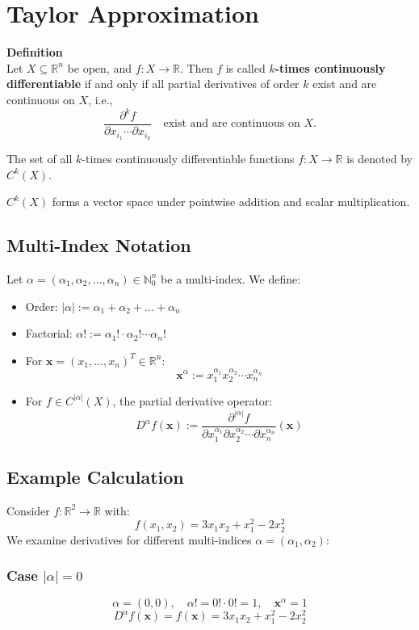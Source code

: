\documentclass{article}
\begin{document}
\section{Taylor Approximation}
\textbf{Definition} \\
Let \( X \subseteq \mathbb{R}^n \) be open, and \( f: X \to \mathbb{R} \). Then \( f \) is called 
\textbf{$k$-times continuously differentiable} if and only if all partial derivatives of order \( k \) exist and are continuous on \( X \), i.e.,
\[
\frac{\partial^k f}{\partial x_{i_1} \cdots \partial x_{i_k}} \quad \text{exist and are continuous on } X.
\]

The set of all $k$-times continuously differentiable functions \( f: X \to \mathbb{R} \) is denoted by \( C^k(X) \).

\( C^k(X) \) forms a vector space under pointwise addition and scalar multiplication.

\subsection*{Multi-Index Notation}
Let \( \alpha = (\alpha_1, \alpha_2, \dots, \alpha_n) \in \mathbb{N}_0^n \) be a multi-index. We define:
\begin{itemize}
    \item Order: \( |\alpha| := \alpha_1 + \alpha_2 + \dots + \alpha_n \)
    \item Factorial: \( \alpha! := \alpha_1! \cdot \alpha_2! \cdots \alpha_n! \)
    \item For \( \bm{x} = (x_1, \dots, x_n)^T \in \mathbb{R}^n \):
    \[
    \bm{x}^\alpha := x_1^{\alpha_1} x_2^{\alpha_2} \cdots x_n^{\alpha_n}
    \]
    \item For \( f \in C^{|\alpha|}(X) \), the partial derivative operator:
    \[
    D^\alpha f(\bm{x}) := \frac{\partial^{|\alpha|} f}{\partial x_1^{\alpha_1} \partial x_2^{\alpha_2} \cdots \partial x_n^{\alpha_n}} (\bm{x})
    \]
\end{itemize}
\newpage
\subsection*{Example Calculation}
Consider \( f: \mathbb{R}^2 \to \mathbb{R} \) with:
\[
f(x_1, x_2) = 3x_1x_2 + x_1^2 - 2x_2^2
\]
We examine derivatives for different multi-indices \( \alpha = (\alpha_1, \alpha_2) \):

\subsubsection{Case \( |\alpha| = 0 \)}
\[
\alpha = (0, 0), \quad \alpha! = 0! \cdot 0! = 1, \quad \bm{x}^\alpha = 1
\]
\[
D^\alpha f(\bm{x}) = f(\bm{x}) = 3x_1x_2 + x_1^2 - 2x_2^2
\]
\end{document}
